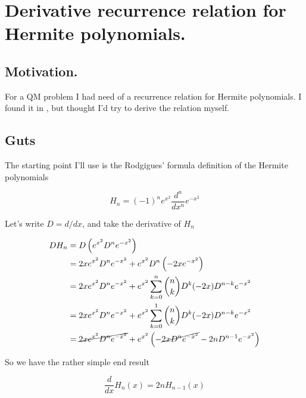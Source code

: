 %
%

\chapter{Derivative recurrence relation for Hermite polynomials.}
\label{chap:hermiteDerivativeRecurranceRelation}
{}
\date{Jan 3, 2012}

\beginArtNoToc

\section{Motivation.}

For a QM problem I had need of a recurrence relation for Hermite polynomials.  I found it in \cite{abramowitz1964handbook}, but thought I'd try to derive the relation myself.

\section{Guts}

The starting point I'll use is the Rodgigues' formula definition of the Hermite polynomials

\begin{equation}\label{eqn:hermiteDerivativeRecurranceRelation:10}
H_n = (-1)^n e^{x^2} \frac{d^n}{dx^n} e^{-x^2}
\end{equation}

Let's write $D = d/dx$, and take the derivative of $H_n$

\begin{align*}
D H_n 
&= D \left( e^{x^2} D^n e^{-x^2} \right) \\
&= 
2 x e^{x^2} D^n e^{-x^2} 
+ e^{x^2} D^n \left( - 2 x e^{-x^2} \right) \\
&= 
2 x e^{x^2} D^n e^{-x^2} 
+ e^{x^2} \sum_{k=0}^n \binom{n}{k} D^k (-2 x) D^{n-k} e^{-x^2} \\
&= 
2 x e^{x^2} D^n e^{-x^2} 
+ e^{x^2} \sum_{k=0}^1 \binom{n}{k} D^k (-2 x) D^{n-k} e^{-x^2} \\
&= 
\cancel{2 x e^{x^2} D^n e^{-x^2} }
+ e^{x^2} \left(
-\cancel{2 x D^{n} e^{-x^2} }
- 2 n D^{n-1} e^{-x^2} 
\right) 
\end{align*}

So we have the rather simple end result

\begin{equation}\label{eqn:hermiteDerivativeRecurranceRelation:30}
\frac{d}{dx} H_n(x)
=
2 n H_{n-1}(x)
\end{equation}

\EndArticle
